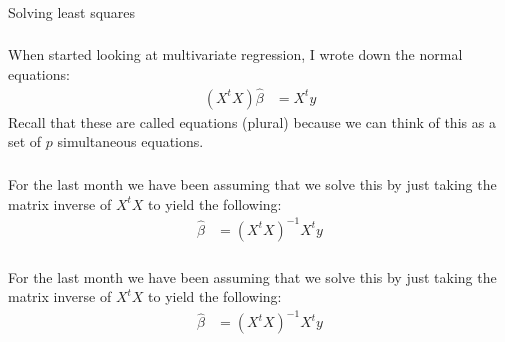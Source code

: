 \begin{frame}[fragile] \frametitle{}

\begin{flushright}
{\color{yaleblue}\sc\fontsize{1cm}{0cm}\selectfont Solving least squares}
\end{flushright}

\end{frame}

\begin{frame}[fragile] \frametitle{}

When started looking at multivariate regression, I wrote down the
normal equations:
\begin{align*}
(X^t X) \widehat{\beta} &= X^t y
\end{align*}
Recall that these are called equations (plural) because we can think
of this as a set of $p$ simultaneous equations.

\end{frame}

\begin{frame}[fragile] \frametitle{}

For the last month we have been assuming that we solve this by
just taking the matrix inverse of $X^tX$ to yield the following:
\begin{align*}
 \widehat{\beta} &= (X^t X)^{-1} X^t y
\end{align*}

\end{frame}

\begin{frame}[fragile] \frametitle{}

For the last month we have been assuming that we solve this by
just taking the matrix inverse of $X^tX$ to yield the following:
\begin{align*}
 \widehat{\beta} &= (X^t X)^{-1} X^t y
\end{align*}

\end{frame}


